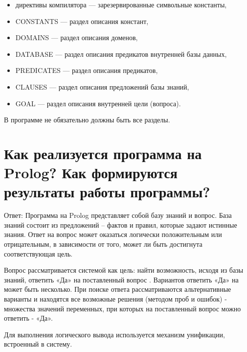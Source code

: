\documentclass[12pt]{report}
\begin{document}
\begin{itemize}
	\item директивы компилятора — зарезервированные символьные константы,
	\item CONSTANTS — раздел описания констант,
	\item DOMAINS — раздел описания доменов,
	\item DATABASE — раздел описания предикатов внутренней базы данных,
	\item PREDICATES — раздел описания предикатов,
	\item CLAUSES — раздел описания предложений базы знаний,
	\item GOAL — раздел описания внутренней цели (вопроса).
\end{itemize}

В программе не обязательно должны быть все разделы.























\section{Как реализуется программа на Prolog? Как формируются результаты работы программы?}

Ответ: Программа на Prolog представляет собой базу знаний и вопрос. База знаний состоит из предложений -- фактов и правил, которые задают истинные знания. Ответ на вопрос может оказаться логически положительным или отрицательным, в зависимости от того, может ли быть достигнута соответствующая цель. 

Вопрос рассматривается системой как цель: найти возможность, исходя из базы знаний, ответить «Да» на поставленный вопрос . Вариантов ответить «Да» на может быть несколько. При поиске ответа рассматриваются альтернативные варианты и находятся все возможные решения (методом проб и ошибок) - множества значений переменных, при которых на поставленный вопрос можно ответить - «Да».


Для выполнения логического вывода используется механизм унификации, встроенный в систему.\\
\end{document}
